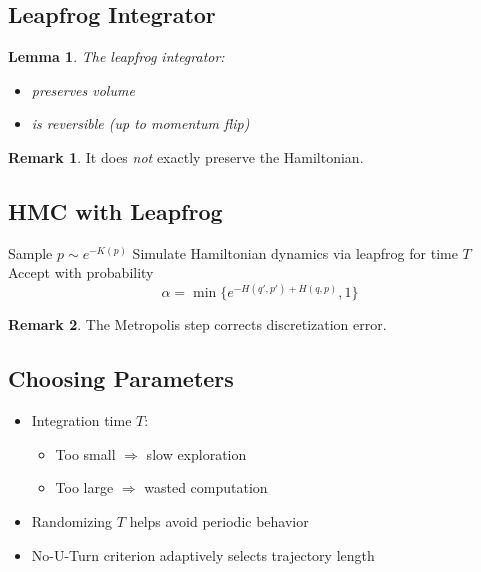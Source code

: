 \documentclass[12pt,oneside]{book}
\numberwithin{equation}{section}
\theoremstyle{definition}
\newtheorem{remark}{Remark}[section]
\theoremstyle{plain}
\newtheorem{lemma}{Lemma}[section]
\theoremstyle{remark}
\begin{document}
\subsection{Leapfrog Integrator}

\begin{lemma}
The leapfrog integrator:
\begin{itemize}
\item preserves volume
\item is reversible (up to momentum flip)
\end{itemize}
\end{lemma}

\begin{remark}
It does \emph{not} exactly preserve the Hamiltonian.
\end{remark}


\subsection*{HMC with Leapfrog}

\begin{algorithm}
\caption{Hamiltonian Monte Carlo (practical)}
\begin{algorithmic}
\State Sample $p \sim e^{-K(p)}$
\State Simulate Hamiltonian dynamics via leapfrog for time $T$
\State Accept with probability
\[
\alpha = \min\{e^{-H(q',p') + H(q,p)}, 1\}
\]
\end{algorithmic}
\end{algorithm}

\begin{remark}
The Metropolis step corrects discretization error.
\end{remark}


\subsection*{Choosing Parameters}

\begin{itemize}
\item Integration time $T$:
\begin{itemize}
\item Too small $\Rightarrow$ slow exploration
\item Too large $\Rightarrow$ wasted computation
\end{itemize}
\item Randomizing $T$ helps avoid periodic behavior
\item No-U-Turn criterion adaptively selects trajectory length
\end{itemize}
\end{document}
